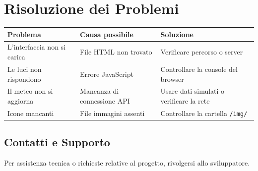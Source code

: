 \documentclass[a4paper,12pt]{article}
\begin{document}
\section{Risoluzione dei Problemi}

\begin{tabular}{|p{5cm}|p{5cm}|p{5cm}|}
\hline
\textbf{Problema} & \textbf{Causa possibile} & \textbf{Soluzione} \\
\hline
L’interfaccia non si carica & File HTML non trovato & Verificare percorso o server \\
\hline
Le luci non rispondono & Errore JavaScript & Controllare la console del browser \\
\hline
Il meteo non si aggiorna & Mancanza di connessione API & Usare dati simulati o verificare la rete \\
\hline
Icone mancanti & File immagini assenti & Controllare la cartella \texttt{/img/} \\
\hline
\end{tabular}

\subsection{Contatti e Supporto}

Per assistenza tecnica o richieste relative al progetto, rivolgersi allo sviluppatore.
\end{document}
